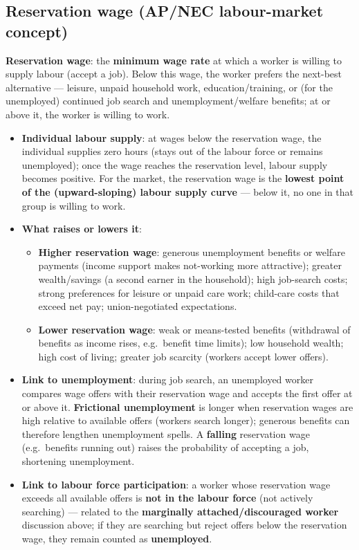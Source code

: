 \documentclass[a4paper,12pt]{article}
\newcommand{\needbold}[1]{\textcolor{red!70!black}{\textbf{#1}}}
\begin{document}
\subsection*{Reservation wage (AP/NEC labour-market concept)}\label{sec:add-reservation}
\needbold{Reservation wage}: the \textbf{minimum wage rate} at which a worker is willing to supply labour (accept a job). Below this wage, the worker prefers the next-best alternative --- leisure, unpaid household work, education/training, or (for the unemployed) continued job search and unemployment/welfare benefits; at or above it, the worker is willing to work.
\begin{itemize}
  \item \textbf{Individual labour supply}: at wages below the reservation wage, the individual supplies zero hours (stays out of the labour force or remains unemployed); once the wage reaches the reservation level, labour supply becomes positive. For the market, the reservation wage is the \textbf{lowest point of the (upward-sloping) labour supply curve} --- below it, no one in that group is willing to work.
  \item \textbf{What raises or lowers it}:
  \begin{itemize}
    \item \textbf{Higher reservation wage}: generous unemployment benefits or welfare payments (income support makes not-working more attractive); greater wealth/savings (a second earner in the household); high job-search costs; strong preferences for leisure or unpaid care work; child-care costs that exceed net pay; union-negotiated expectations.
    \item \textbf{Lower reservation wage}: weak or means-tested benefits (withdrawal of benefits as income rises, e.g.\ benefit time limits); low household wealth; high cost of living; greater job scarcity (workers accept lower offers).
  \end{itemize}
  \item \textbf{Link to unemployment}: during job search, an unemployed worker compares wage offers with their reservation wage and accepts the first offer at or above it. \textbf{Frictional unemployment} is longer when reservation wages are high relative to available offers (workers search longer); generous benefits can therefore lengthen unemployment spells. A \textbf{falling} reservation wage (e.g.\ benefits running out) raises the probability of accepting a job, shortening unemployment.
  \item \textbf{Link to labour force participation}: a worker whose reservation wage exceeds all available offers is \textbf{not in the labour force} (not actively searching) --- related to the \textbf{marginally attached/discouraged worker} discussion above; if they are searching but reject offers below the reservation wage, they remain counted as \textbf{unemployed}.

\end{itemize}
\end{document}
